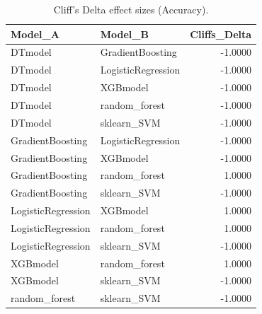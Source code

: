\begin{table}[t]
\centering
\begin{tabular}{llr}
\toprule
Model_A & Model_B & Cliffs_Delta \\
\midrule
DTmodel & GradientBoosting & -1.0000 \\
DTmodel & LogisticRegression & -1.0000 \\
DTmodel & XGBmodel & -1.0000 \\
DTmodel & random_forest & -1.0000 \\
DTmodel & sklearn_SVM & -1.0000 \\
GradientBoosting & LogisticRegression & -1.0000 \\
GradientBoosting & XGBmodel & -1.0000 \\
GradientBoosting & random_forest & 1.0000 \\
GradientBoosting & sklearn_SVM & -1.0000 \\
LogisticRegression & XGBmodel & 1.0000 \\
LogisticRegression & random_forest & 1.0000 \\
LogisticRegression & sklearn_SVM & -1.0000 \\
XGBmodel & random_forest & 1.0000 \\
XGBmodel & sklearn_SVM & -1.0000 \\
random_forest & sklearn_SVM & -1.0000 \\
\bottomrule
\end{tabular}
\caption{Cliff's Delta effect sizes (Accuracy).}
\label{tab:cliffs_Accuracy}
\end{table}